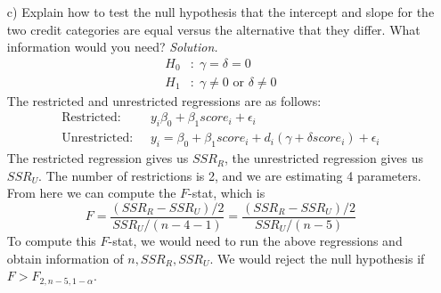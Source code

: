 \documentclass[
]{article}
\begin{document}
\begin{enumerate}
\item[c)] Explain how to test the null hypothesis that the intercept and slope for the two credit categories are equal versus the alternative that they differ. What information would you need?
\newline
\newline
\textit{Solution.} 
\[\begin{aligned}
H_0 &: \; \gamma = \delta = 0 \\
H_1 &: \; \gamma \neq 0 \text{ or } \delta \neq 0 
\end{aligned}\]
The restricted and unrestricted regressions are as follows: 
\[\begin{aligned}
\text{Restricted: }\; &y_i \beta_0 + \beta_1 score_i + \epsilon_i\\
\text{Unrestricted: }\; &y_i = \beta_0 + \beta_1 score_i + d_i(\gamma + \delta score_i) + \epsilon_i
\end{aligned}\]
The restricted regression gives us $SSR_R$, the unrestricted regression gives us $SSR_U$. The number of restrictions is 2, and we are estimating 4 parameters.  From here we can compute the $F$-stat, which is 
\[F = \frac{(SSR_R - SSR_U) / 2}{SSR_U/(n - 4 - 1)} = \frac{(SSR_R - SSR_U) / 2}{SSR_U/(n - 5)}\]
To compute this $F$-stat, we would need to run the above regressions and obtain information of $n, SSR_R, SSR_U$. We would reject the null hypothesis if $F > F_{2, n-5, 1-\alpha}$. 

\end{enumerate}
\end{document}
